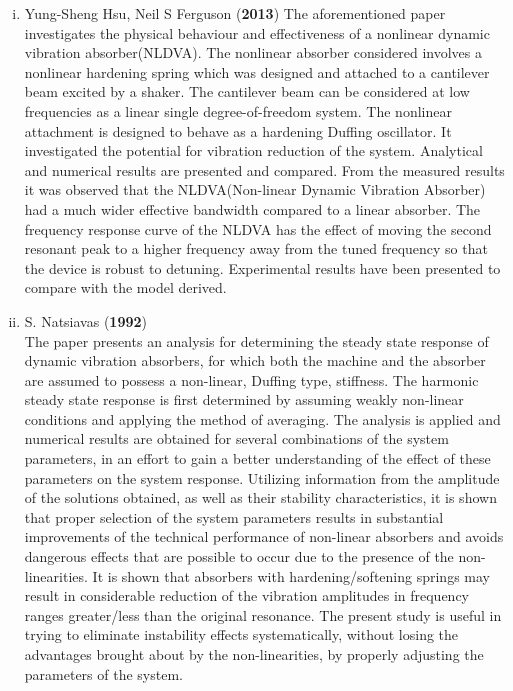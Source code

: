 \begin{enumerate}[i)]
\item {Yung-Sheng Hsu, Neil S Ferguson (\textbf{2013})}
The aforementioned paper investigates the physical behaviour and effectiveness of a nonlinear dynamic vibration absorber(NLDVA). The nonlinear absorber considered involves a nonlinear hardening spring which was designed and attached to a cantilever beam excited by a shaker. The cantilever beam can be considered at low frequencies as a linear single degree-of-freedom system. The nonlinear attachment is designed to behave as a hardening Duffing oscillator.
It investigated the potential for vibration reduction of the system. Analytical and numerical results are presented and compared. From the measured results it was observed that the NLDVA(Non-linear Dynamic Vibration Absorber) had a much wider effective bandwidth compared to a linear absorber. The frequency response curve of the NLDVA has the effect of moving the second resonant peak to a higher frequency away from the tuned frequency so that the device is robust to detuning.
Experimental results have been presented to compare with
the model derived.

\item {S. Natsiavas (\textbf{1992})}\\
The paper presents an analysis for determining the steady state response of dynamic vibration absorbers, for which both the machine and the absorber are assumed to possess a non-linear, Duffing type, stiffness. The harmonic steady state response is first determined by assuming weakly non-linear conditions and applying the method of averaging.
The analysis is applied and numerical results are obtained for several combinations of the system parameters, in an effort to gain a better understanding of the effect of these parameters on the system response. Utilizing information from the amplitude of the solutions obtained, as well as their stability characteristics, it is shown that proper selection
of the system parameters results in substantial improvements of the technical performance of non-linear absorbers and avoids dangerous effects that are possible to occur due to the presence of the non-linearities. It is shown that absorbers with hardening/softening springs may result in considerable reduction of the vibration amplitudes in frequency ranges greater/less than the original resonance. The present study is useful in trying to eliminate instability effects systematically, without losing the advantages brought about by the non-linearities, by properly adjusting the parameters of the system.\\
\end{enumerate}

